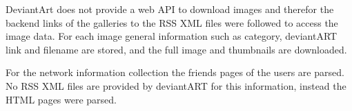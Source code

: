 DeviantArt does not provide a web API to download images and therefor the backend links of the galleries to the RSS XML files were followed to access
the image data. For each image general information such as category, deviantART link and filename are stored, and the full image and 
thumbnails are downloaded.

For the network information collection the friends pages 
of the users are parsed. No RSS XML files are provided by deviantART for this
information, instead the HTML pages were parsed.





